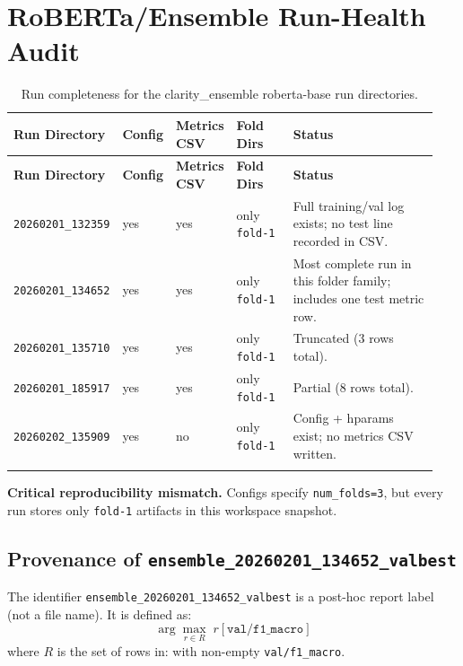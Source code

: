 \documentclass[11pt]{article}
\begin{document}
\section{RoBERTa/Ensemble Run-Health Audit}
\begin{longtable}{p{0.22\linewidth}p{0.10\linewidth}p{0.10\linewidth}p{0.14\linewidth}p{0.38\linewidth}}
\toprule
\textbf{Run Directory} & \textbf{Config} & \textbf{Metrics CSV} & \textbf{Fold Dirs} & \textbf{Status} \\
\midrule
\endfirsthead
\toprule
\textbf{Run Directory} & \textbf{Config} & \textbf{Metrics CSV} & \textbf{Fold Dirs} & \textbf{Status} \\
\midrule
\endhead
\texttt{20260201\_132359} & yes & yes & only \texttt{fold-1} & Full training/val log exists; no test line recorded in CSV. \\
\texttt{20260201\_134652} & yes & yes & only \texttt{fold-1} & Most complete run in this folder family; includes one test metric row. \\
\texttt{20260201\_135710} & yes & yes & only \texttt{fold-1} & Truncated (3 rows total). \\
\texttt{20260201\_185917} & yes & yes & only \texttt{fold-1} & Partial (8 rows total). \\
\texttt{20260202\_135909} & yes & no & only \texttt{fold-1} & Config + hparams exist; no metrics CSV written. \\
\bottomrule
\caption{Run completeness for the clarity\_ensemble roberta-base run directories.}
\end{longtable}

\noindent\textbf{Critical reproducibility mismatch.} Configs specify \texttt{num\_folds=3}, but every run stores only \texttt{fold-1} artifacts in this workspace snapshot.

\subsection*{Provenance of \texttt{ensemble\_20260201\_134652\_valbest}}
The identifier \texttt{ensemble\_20260201\_134652\_valbest} is a post-hoc report label (not a file name). It is defined as:
\[
\arg\max_{r \in R} \; r[\texttt{val/f1\_macro}]
\]
where \(R\) is the set of rows in:
with non-empty \texttt{val/f1\_macro}.
\end{document}
